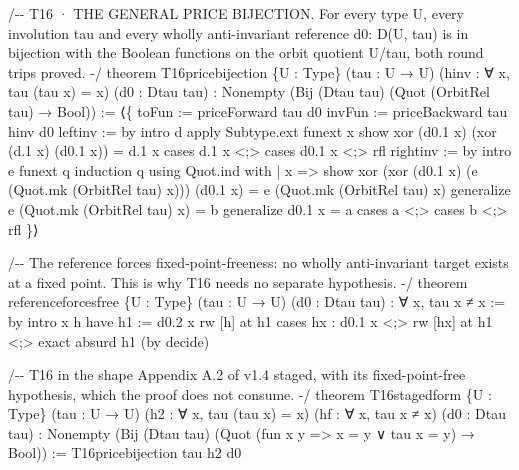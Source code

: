 \documentclass[10pt]{article}
\renewcommand{\_}{\origunderscore\allowbreak}
\newenvironment{Shaded}{}{}
\newcommand{\NormalTok}[1]{#1}
\begin{document}
\begin{Shaded}
\begin{Highlighting}[]
\NormalTok{/{-}{-} T16 · THE GENERAL PRICE BIJECTION. For every type U, every involution tau and}
\NormalTok{    every wholly anti{-}invariant reference d0: D(U, tau) is in bijection with the}
\NormalTok{    Boolean functions on the orbit quotient U/tau, both round trips proved. {-}/}
\NormalTok{theorem T16\_price\_bijection \{U : Type\} (tau : U → U) (hinv : ∀ x, tau (tau x) = x)}
\NormalTok{    (d0 : Dtau tau) : Nonempty (Bij (Dtau tau) (Quot (OrbitRel tau) → Bool)) :=}
\NormalTok{  ⟨\{ toFun := priceForward tau d0}
\NormalTok{     invFun := priceBackward tau hinv d0}
\NormalTok{     left\_inv := by}
\NormalTok{       intro d}
\NormalTok{       apply Subtype.ext}
\NormalTok{       funext x}
\NormalTok{       show xor (d0.1 x) (xor (d.1 x) (d0.1 x)) = d.1 x}
\NormalTok{       cases d.1 x \textless{};\textgreater{} cases d0.1 x \textless{};\textgreater{} rfl}
\NormalTok{     right\_inv := by}
\NormalTok{       intro e}
\NormalTok{       funext q}
\NormalTok{       induction q using Quot.ind with}
\NormalTok{       | \_ x =\textgreater{}}
\NormalTok{         show xor (xor (d0.1 x) (e (Quot.mk (OrbitRel tau) x))) (d0.1 x)}
\NormalTok{            = e (Quot.mk (OrbitRel tau) x)}
\NormalTok{         generalize e (Quot.mk (OrbitRel tau) x) = b}
\NormalTok{         generalize d0.1 x = a}
\NormalTok{         cases a \textless{};\textgreater{} cases b \textless{};\textgreater{} rfl \}⟩}

\NormalTok{/{-}{-} The reference forces fixed{-}point{-}freeness: no wholly anti{-}invariant target}
\NormalTok{    exists at a fixed point. This is why T16 needs no separate hypothesis. {-}/}
\NormalTok{theorem reference\_forces\_free \{U : Type\} (tau : U → U) (d0 : Dtau tau) :}
\NormalTok{    ∀ x, tau x ≠ x := by}
\NormalTok{  intro x h}
\NormalTok{  have h1 := d0.2 x}
\NormalTok{  rw [h] at h1}
\NormalTok{  cases hx : d0.1 x \textless{};\textgreater{} rw [hx] at h1 \textless{};\textgreater{} exact absurd h1 (by decide)}

\NormalTok{/{-}{-} T16 in the shape Appendix A.2 of v1.4 staged, with its fixed{-}point{-}free}
\NormalTok{    hypothesis, which the proof does not consume. {-}/}
\NormalTok{theorem T16\_staged\_form \{U : Type\} (tau : U → U) (h2 : ∀ x, tau (tau x) = x)}
\NormalTok{    (\_hf : ∀ x, tau x ≠ x) (d0 : Dtau tau) :}
\NormalTok{    Nonempty (Bij (Dtau tau) (Quot (fun x y =\textgreater{} x = y ∨ tau x = y) → Bool)) :=}
\NormalTok{  T16\_price\_bijection tau h2 d0}


\end{Highlighting}
\end{Shaded}
\end{document}
